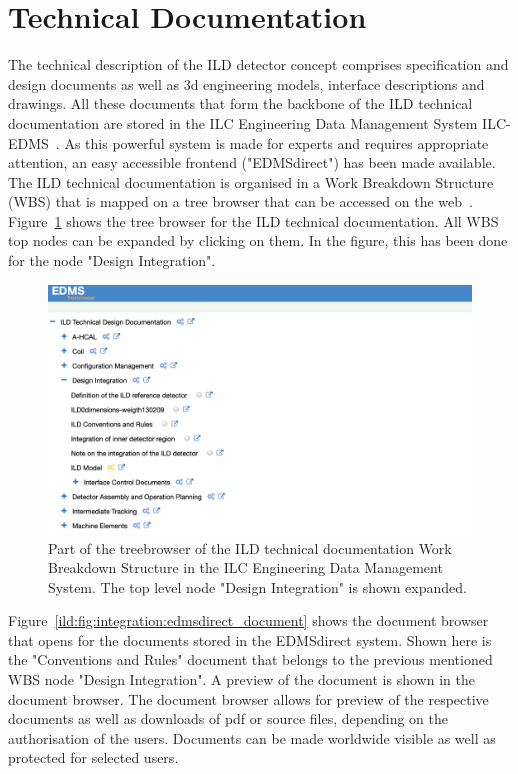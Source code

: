 \section{Technical Documentation}

The technical description of the ILD detector concept comprises specification and design documents as well as 3d engineering models, interface descriptions and drawings. All these documents that form the backbone of the ILD technical documentation are stored in the ILC Engineering Data Management System ILC-EDMS~\cite{ild:bib:edms}. As this powerful system is made for experts and requires appropriate attention, an easy accessible frontend ("EDMSdirect") has been made available. The ILD technical documentation is organised in a Work Breakdown Structure (WBS) that is mapped on a tree browser that can be accessed on the web~\cite{ild:bib:edmsdirect}. Figure~\ref{ild:fig:integration:edmsdirect} shows the tree browser for the ILD technical documentation. All WBS top nodes can be expanded by clicking on them. In the figure, this has been done for the node "Design Integration".


\begin{figure}[t!]
\centering
\includegraphics[width=0.8\hsize]{Integration/fig/EDMS_direct.png}

\caption{\label{ild:fig:integration:edmsdirect}Part of the treebrowser of the ILD technical documentation Work Breakdown Structure in the ILC Engineering Data Management System. The top level node "Design Integration" is shown expanded.}
\end{figure}

Figure~\ref{ild:fig:integration:edmsdirect_document} shows the document browser that opens for the documents stored in the EDMSdirect system. Shown here is the "Conventions and Rules" document that belongs to the previous mentioned WBS node "Design Integration". A preview of the document is shown in the document browser. The document browser allows for preview of the respective documents as well as downloads of pdf or source files, depending on the authorisation of the users. Documents can be made worldwide visible as well as protected for selected users.

